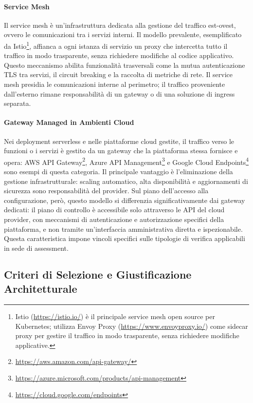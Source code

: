 \paragraph{Service Mesh}
Il service mesh è un'infrastruttura dedicata alla gestione del traffico est-ovest, ovvero le comunicazioni tra i servizi interni. Il modello prevalente, esemplificato da Istio\footnote{Istio (\url{https://istio.io/}) è il principale service mesh open source per Kubernetes; utilizza Envoy Proxy (\url{https://www.envoyproxy.io/}) come sidecar proxy per gestire il traffico in modo trasparente, senza richiedere modifiche applicative.}, affianca a ogni istanza di servizio un proxy che intercetta tutto il traffico in modo trasparente, senza richiedere modifiche al codice applicativo. Questo meccanismo abilita funzionalità trasversali come la mutua autenticazione \gls{TLS} tra servizi, il circuit breaking e la raccolta di metriche di rete. Il service mesh presidia le comunicazioni interne al perimetro; il traffico proveniente dall'esterno rimane responsabilità di un gateway o di una soluzione di ingress separata.



\paragraph{Gateway Managed in Ambienti Cloud}
Nei deployment serverless e nelle piattaforme cloud gestite, il traffico verso le funzioni o i servizi è gestito da un gateway che la piattaforma stessa fornisce e opera: AWS API Gateway\footnote{\url{https://aws.amazon.com/api-gateway/}}, Azure API Management\footnote{\url{https://azure.microsoft.com/products/api-management}} e Google Cloud Endpoints\footnote{\url{https://cloud.google.com/endpoints}} sono esempi di questa categoria. Il principale vantaggio è l'eliminazione della gestione infrastrutturale: scaling automatico, alta disponibilità e aggiornamenti di sicurezza sono responsabilità del provider. Sul piano dell'accesso alla configurazione, però, questo modello si differenzia significativamente dai gateway dedicati: il piano di controllo è accessibile solo attraverso le API del cloud provider, con meccanismi di autenticazione e autorizzazione specifici della piattaforma, e non tramite un'interfaccia amministrativa diretta e ispezionabile. Questa caratteristica impone vincoli specifici sulle tipologie di verifica applicabili in sede di assessment.


\subsection{Criteri di Selezione e Giustificazione Architetturale}\label{subsec:criteri-selezione}

